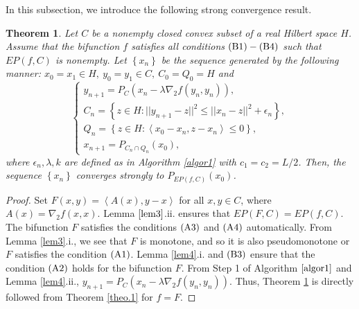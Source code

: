 \documentclass{aims}
\newtheorem{theorem}{Theorem}[section]
\theoremstyle{definition}
\begin{document}
In this subsection, we introduce the following strong convergence result.
\begin{theorem}\label{theo3}
Let $C$ be a nonempty closed convex subset of a real Hilbert space $H$. Assume that the bifunction $f$ satisfies all conditions $\rm (B1)-(B4)$ 
such that $EP(f,C)$ is nonempty. Let $\left\{x_n\right\}$ be the sequence generated by the following manner: 
$x_0=x_1 \in H, ~y_0=y_1\in C,~C_0=Q_0=H$ and
\begin{equation}\label{H2015a}
\left \{
\begin{array}{ll}
y_{n+1}=  P_C\left(x_n-\lambda\nabla_2f(y_n,y_n)\right),\\
C_n=\left\{z\in H:||y_{n+1}-z||^2\leq ||x_n-z||^2+\epsilon_n \right\},\\
Q_n=\left\{z\in H: \left\langle x_0-x_n,z-x_n\right\rangle\le 0\right\},\\
x_{n+1}=P_{C_n\cap Q_n}(x_0),
\end{array}
\right.
\end{equation}
where $\epsilon_n, \lambda, k$ are defined as in Algorithm \ref{algor1} with $c_1=c_2=L/2$.  
Then, the sequence $\left\{x_n\right\}$ converges strongly to $P_{EP(f,C)}(x_0)$.
\end{theorem}
\begin{proof}
Set $F(x,y)=\left\langle A(x),y-x\right\rangle$ for all $x,y\in C$, where $A(x)=\nabla_2 f(x,x)$. Lemma $\ref{lem3}$.ii. ensures that $EP(F,C)=EP(f,C)$. 
The bifunction $F$ satisfies the conditions 
$\rm (A3)$ and $\rm (A4)$ automatically. From Lemma \ref{lem3}.i., we see that $F$ is monotone, and so it is also pseudomonotone 
or $F$ satisfies the condition $\rm (A1)$. Lemma \ref{lem4}.i. and $\rm (B3)$ ensure that the condition $\rm (A2)$ holds for the bifunction $F$. 
From Step 1 of Algorithm $\ref{algor1}$ and Lemma \ref{lem4}.ii., $y_{n+1}=  P_C\left(x_n-\lambda\nabla_2f(y_n,y_n)\right)$. Thus, 
Theorem \ref{theo3} is directly followed from Theorem \ref{theo.1} for $f=F$.
\end{proof}
\end{document}
